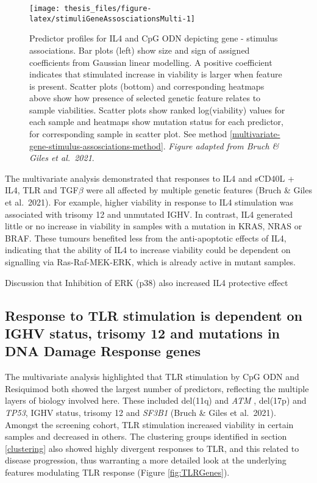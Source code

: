 \documentclass[11pt, a4paper, twosided]{book}
\begin{document}
\begin{figure}

{\centering \texttt{[image: thesis\_files/figure-latex/stimuliGeneAssosciationsMulti-1]} 

}

\caption{Predictor profiles for IL4 and CpG ODN depicting gene - stimulus associations. Bar plots (left) show size and sign of assigned coefficients from Gaussian linear modelling. A positive coefficient indicates that stimulated increase in viability is larger when feature is present. Scatter plots (bottom) and corresponding heatmaps above show how presence of selected genetic feature relates to sample viabilities. Scatter plots show ranked log(viability) values for each sample and heatmaps show mutation status for each predictor, for corresponding sample in scatter plot. See method \ref{multivariate-gene-stimulus-assosciations-method}. \emph{Figure adapted from Bruch \& Giles et al.~2021}.}\label{fig:stimuliGeneAssosciationsMulti}
\end{figure}
The multivariate analysis demonstrated that responses to IL4 and sCD40L + IL4, TLR and TGF\(\beta\) were all affected by multiple genetic features (Bruch \& Giles et al.~2021). For example, higher viability in response to IL4 stimulation was associated with trisomy 12 and unmutated IGHV. In contrast, IL4 generated little or no increase in viability in samples with a mutation in KRAS, NRAS or BRAF. These tumours benefited less from the anti-apoptotic effects of IL4, indicating that the ability of IL4 to increase viability could be dependent on signalling via Ras-Raf-MEK-ERK, which is already active in mutant samples.

Discussion that Inhibition of ERK (p38) also increased IL4 protective effect

\hypertarget{response-to-tlr-stimulation-is-dependent-on-ighv-status-trisomy-12-and-mutations-in-dna-damage-response-genes}{%
\subsection{Response to TLR stimulation is dependent on IGHV status, trisomy 12 and mutations in DNA Damage Response genes}\label{response-to-tlr-stimulation-is-dependent-on-ighv-status-trisomy-12-and-mutations-in-dna-damage-response-genes}}

The multivariate analysis highlighted that TLR stimulation by CpG ODN and Resiquimod both showed the largest number of predictors, reflecting the multiple layers of biology involved here. These included del(11q) and \emph{ATM} , del(17p) and \emph{TP53}, IGHV status, trisomy 12 and \emph{SF3B1} (Bruch \& Giles et al.~2021). Amongst the screening cohort, TLR stimulation increased viability in certain samples and decreased in others. The clustering groups identified in section \ref{clustering} also showed highly divergent responses to TLR, and this related to disease progression, thus warranting a more detailed look at the underlying features modulating TLR response (Figure \ref{fig:TLRGenes}).
\end{document}
